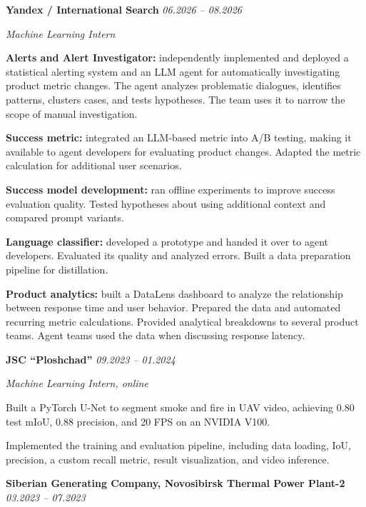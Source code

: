 
\textbf{Yandex / International Search} \hfill \emph{06.2026 -- 08.2026}

\textit{Machine Learning Intern}
\begin{cvitems}
    \item \textbf{Alerts and Alert Investigator:} independently implemented and deployed a statistical alerting system and an LLM agent for automatically investigating product metric changes. The agent analyzes problematic dialogues, identifies patterns, clusters cases, and tests hypotheses. The team uses it to narrow the scope of manual investigation.
    \item \textbf{Success metric:} integrated an LLM-based metric into A/B testing, making it available to agent developers for evaluating product changes. Adapted the metric calculation for additional user scenarios.
    \item \textbf{Success model development:} ran offline experiments to improve success evaluation quality. Tested hypotheses about using additional context and compared prompt variants.
    \item \textbf{Language classifier:} developed a prototype and handed it over to agent developers. Evaluated its quality and analyzed errors. Built a data preparation pipeline for distillation.
    \item \textbf{Product analytics:} built a DataLens dashboard to analyze the relationship between response time and user behavior. Prepared the data and automated recurring metric calculations. Provided analytical breakdowns to several product teams. Agent teams used the data when discussing response latency.
\end{cvitems}

\textbf{JSC ``Ploshchad''} \hfill \emph{09.2023 -- 01.2024}

\textit{Machine Learning Intern, online}
\begin{cvitems}
    \item Built a PyTorch U-Net to segment smoke and fire in UAV video, achieving 0.80 test mIoU, 0.88 precision, and 20 FPS on an NVIDIA V100.
    \item Implemented the training and evaluation pipeline, including data loading, IoU, precision, a custom recall metric, result visualization, and video inference.
\end{cvitems}
	
\textbf{Siberian Generating Company, Novosibirsk Thermal Power Plant-2} \hfill \emph{03.2023 -- 07.2023}
	
